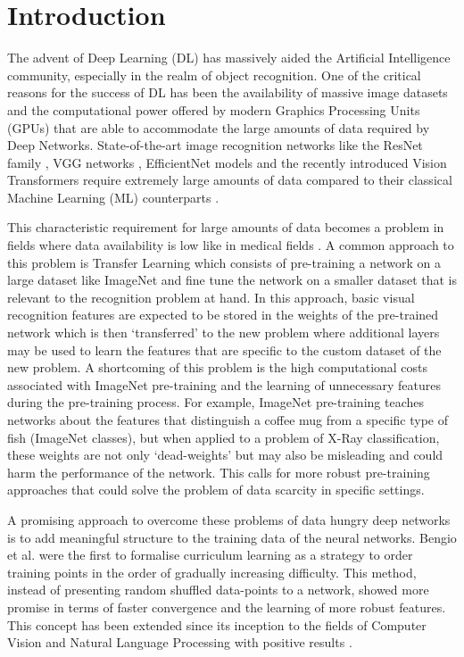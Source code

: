 \section{Introduction}
The advent of Deep Learning (DL) has massively aided the Artificial Intelligence community, especially in the realm of object recognition. One of the critical reasons for the success of DL has been the availability of massive image datasets \cite{Deng2009ImageNet} and the computational power offered by modern Graphics Processing Units (GPUs) that are able to accommodate the large amounts of data required by Deep Networks. State-of-the-art image recognition networks like the ResNet family \cite{he2016resnet}, VGG networks \cite{simonyan2014vgg}, EfficientNet models \cite{tan2019efficientnet} and the recently introduced Vision Transformers \cite{dosovitskiy2020vit} require extremely large amounts of data compared to their classical Machine Learning (ML) counterparts \cite{alzubaidi2021dlreview}. 

\noindent
This characteristic requirement for large amounts of data becomes a problem in fields where data availability is low like in medical fields \cite{salehi2023cnnmedstudy}. A common approach to this problem is Transfer Learning \cite{Zhuang2021TL} which consists of pre-training a network on a large dataset like ImageNet \cite{Deng2009ImageNet} and fine tune the network on a smaller dataset that is relevant to the recognition problem at hand. In this approach, basic visual recognition features are expected to be stored in the weights of the pre-trained network which is then `transferred' to the new problem where additional layers may be used to learn the features that are specific to the custom dataset of the new problem. A shortcoming of this problem is the high computational costs associated with ImageNet pre-training and the learning of unnecessary features during the pre-training process. For example, ImageNet pre-training teaches networks about the features that distinguish a coffee mug from a specific type of fish (ImageNet classes), but when applied to a problem of X-Ray classification, these weights are not only `dead-weights' but may also be misleading and could harm the performance of the network. This calls for more robust pre-training approaches that could solve the problem of data scarcity in specific settings.

\noindent
A promising approach to overcome these problems of data hungry deep networks is to add meaningful structure to the training data of the neural networks. Bengio et al. \cite{bengio2009curriculum} were the first to formalise curriculum learning as a strategy to order training points in the order of gradually increasing difficulty. This method, instead of presenting random shuffled data-points to a network, showed more promise in terms of faster convergence and the learning of more robust features. This concept has been extended since its inception to the fields of Computer Vision and Natural Language Processing with positive results \cite{wang2021curriculumsurvey}.

